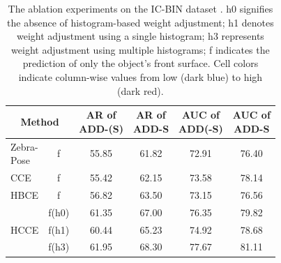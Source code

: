 
\begin{table}[t]
\centering
\footnotesize
\caption{The ablation experiments on the IC-BIN dataset \cite{icbin}.
h0 signifies the absence of histogram-based weight adjustment; h1 denotes weight adjustment using a single histogram; h3 represents weight adjustment using multiple histograms; f indicates the prediction of only the object’s front surface. Cell colors indicate column-wise values from low (dark blue) to high (dark red).}
\begin{tabular}{l|c|cccc}
\toprule
\multicolumn{2}{c}{Method}     & \makecell{AR of \\ ADD-(S)} & \makecell{AR of \\ ADD-S} & \makecell{AUC of \\ ADD(-S)} & \makecell{AUC of \\ ADD-S} \\
\midrule
\makecell{Zebra- \\ Pose}      & f         & \cellcolor[HTML]{D0E8F0} 55.85 & \cellcolor[HTML]{ADD8E6} 61.82 & \cellcolor[HTML]{ADD8E6} 72.91 & \cellcolor[HTML]{ADD8E6} 76.40 \\
\midrule
CCE  & f      & \cellcolor[HTML]{ADD8E6} 55.42 & \cellcolor[HTML]{D0E8F0} 62.15 & \cellcolor[HTML]{E8F4F8} 73.58 & \cellcolor[HTML]{E8F4F8} 78.14 \\
\midrule
HBCE & f      & \cellcolor[HTML]{E8F4F8} 56.82 & \cellcolor[HTML]{E8F4F8} 63.50 & \cellcolor[HTML]{D0E8F0} 73.15 & \cellcolor[HTML]{D0E8F0} 76.56 \\
\midrule
\multirow{3}{*}{HCCE} & f(h0)  & \cellcolor[HTML]{F0D0D0} 61.35 & \cellcolor[HTML]{F0D0D0} 67.00 & \cellcolor[HTML]{F0D0D0} 76.35 & \cellcolor[HTML]{F0D0D0} 79.82 \\
& f(h1) & \cellcolor[HTML]{F8E8E8} 60.44   & \cellcolor[HTML]{F8E8E8} 65.23 & \cellcolor[HTML]{F8E8E8} 74.92 & \cellcolor[HTML]{F8E8E8} 78.68 \\
& f(h3) & \cellcolor[HTML]{EAA4A4} 61.95  & \cellcolor[HTML]{EAA4A4} 68.30 & \cellcolor[HTML]{EAA4A4} 77.67 & \cellcolor[HTML]{EAA4A4} 81.11 \\
\bottomrule
\end{tabular}
\label{tab1}
\end{table}
